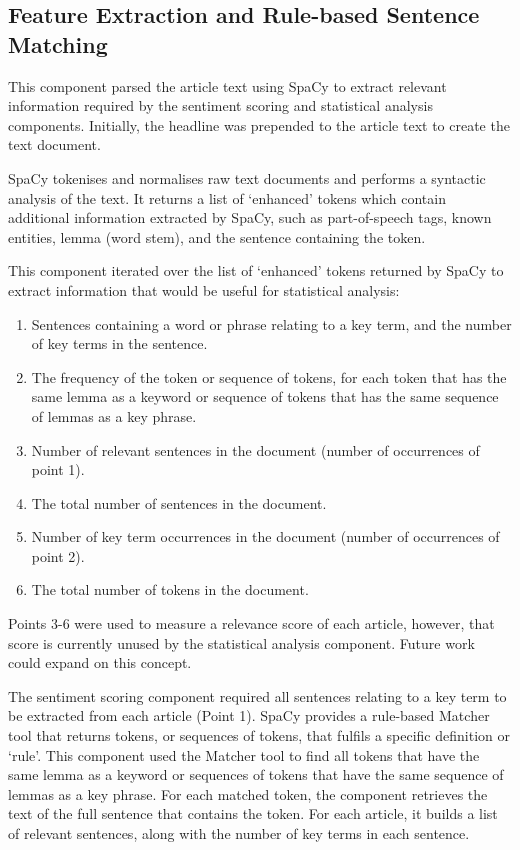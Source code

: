 \documentclass{report}
\begin{document}
\subsection{Feature Extraction and Rule-based Sentence Matching} \label{des-matching}

This component parsed the article text using SpaCy \cite{SpaCy} to extract relevant information required by the sentiment scoring and statistical analysis components.
Initially, the headline was prepended to the article text to create the text document.

SpaCy tokenises and normalises raw text documents and performs a syntactic analysis of the text. 
It returns a list of `enhanced' tokens which contain additional information extracted by SpaCy, such as part-of-speech tags, known entities, lemma (word stem), and the sentence containing the token.

This component iterated over the list of `enhanced' tokens returned by SpaCy to extract information that would be useful for statistical analysis:
\begin{enumerate}
	\item Sentences containing a word or phrase relating to a key term, and the number of key terms in the sentence.
	\item The frequency of the token or sequence of tokens, for each token that has the same lemma as a keyword or sequence of tokens that has the same sequence of lemmas as a key phrase.
	\item Number of relevant sentences in the document (number of occurrences of point 1).
	\item The total number of sentences in the document.
	\item Number of key term occurrences in the document (number of occurrences of point 2).
	\item The total number of tokens in the document.
\end{enumerate}

Points 3-6 were used to measure a relevance score of each article, however, that score is currently unused by the statistical analysis component. 
Future work could expand on this concept.

The sentiment scoring component required all sentences relating to a key term to be extracted from each article (Point 1).
SpaCy provides a rule-based Matcher tool that returns tokens, or sequences of tokens, that fulfils a specific definition or `rule'.
This component used the Matcher tool to find all tokens that have the same lemma as a keyword or sequences of tokens that have the same sequence of lemmas as a key phrase.
For each matched token, the component retrieves the text of the full sentence that contains the token. 
For each article, it builds a list of relevant sentences, along with the number of key terms in each sentence.
\end{document}
